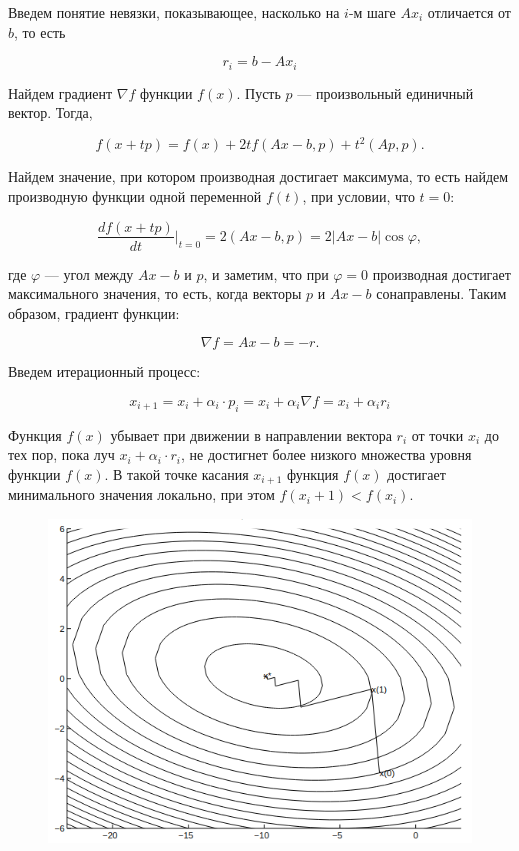 \documentclass{article}
\begin{document}
Введем понятие невязки, показывающее, насколько на $i$-м шаге $Ax_i$ отличается от $b$, то есть

\begin{equation}
    r_i =  b - Ax_i
\end{equation}

Найдем градиент $\nabla f$ функции $f(x)$. Пусть $p$ --- произвольный единичный вектор. Тогда, 

\begin{equation*}
    f(x + tp) = f(x) + 2tf(Ax - b, p) + t^2 (Ap, p).
\end{equation*}

Найдем значение, при котором производная достигает максимума, то есть найдем производную функции одной переменной
$f(t)$, при условии, что $t = 0$:

\begin{equation}
    \frac{df(x + tp)}{dt} \Bigr|_{t=0} = 2(Ax - b, p) = 2 |Ax - b| \cos \varphi,
\end{equation}

где $\varphi$ --- угол между $Ax - b$ и $p$, и заметим, что при $\varphi = 0$ производная достигает максимального значения, 
то есть, когда векторы $p$ и $Ax - b$ сонаправлены. Таким образом, градиент функции:

\begin{equation*}
    \nabla f = Ax - b = -r.
\end{equation*}

Введем итерационный процесс:

\begin{equation}
    x_{i + 1} = x_{i} + \alpha_{i} \cdot p_{i} = x_{i} + \alpha_i \nabla f= x_i + \alpha_i r_i
\end{equation}

Функция $f(x)$ убывает при движении в направлении вектора $r_i$ от точки $x_i$ до
тех пор, пока луч $x_i + \alpha_i \cdot r_i$, не достигнет более низкого множества
уровня функции $f(x)$. В такой точке касания $x_{i + 1}$ функция $f(x)$ достигает минимального значения локально, 
при этом $f(x_i + 1) < f(x_i)$.

\begin{figure}[h]
    \centering
    \includegraphics[width=0.5\linewidth]{image.png}
\end{figure}
\end{document}
